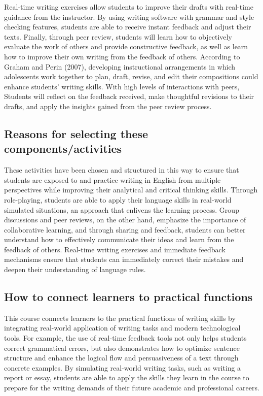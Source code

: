 \documentclass[11pt]{article}
\begin{document}
Real-time writing exercises allow students to improve their drafts with real-time guidance from the instructor. By using writing software with grammar and style checking features, students are able to receive instant feedback and adjust their texts. Finally, through peer review, students will learn how to objectively evaluate the work of others and provide constructive feedback, as well as learn how to improve their own writing from the feedback of others. According to Graham and Perin (2007), developing instructional arrangements in which adolescents work together to plan, draft, revise, and edit their compositions could enhance students’ writing skills. With high levels of interactions with peers, Students will reflect on the feedback received, make thoughtful revisions to their drafts, and apply the insights gained from the peer review process.

\subsection{Reasons for selecting these components/activities}

These activities have been chosen and structured in this way to ensure that students are exposed to and practice writing in English from multiple perspectives while improving their analytical and critical thinking skills. Through role-playing, students are able to apply their language skills in real-world simulated situations, an approach that enlivens the learning process. Group discussions and peer reviews, on the other hand, emphasize the importance of collaborative learning, and through sharing and feedback, students can better understand how to effectively communicate their ideas and learn from the feedback of others. Real-time writing exercises and immediate feedback mechanisms ensure that students can immediately correct their mistakes and deepen their understanding of language rules.

\subsection{How to connect learners to practical functions}

This course connects learners to the practical functions of writing skills by integrating real-world application of writing tasks and modern technological tools. For example, the use of real-time feedback tools not only helps students correct grammatical errors, but also demonstrates how to optimize sentence structure and enhance the logical flow and persuasiveness of a text through concrete examples. By simulating real-world writing tasks, such as writing a report or essay, students are able to apply the skills they learn in the course to prepare for the writing demands of their future academic and professional careers.
\end{document}
